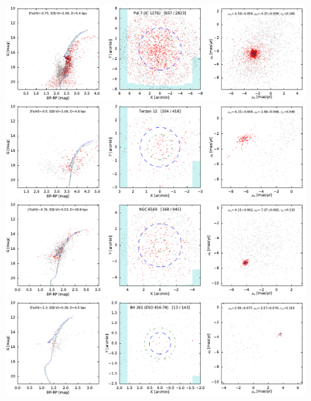 \documentclass[usenatbib]{mnras}
\begin{document}
\clearpage\begin{figure}
\contcaption{}
\includegraphics{figs/IC_1276_Pal_7.pdf}
\includegraphics{figs/Terzan_12.pdf}
\includegraphics{figs/NGC_6569.pdf}
\includegraphics{figs/BH_261_AL_3.pdf}
\end{figure}
\end{document}
